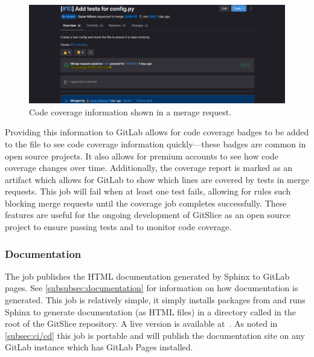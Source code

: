 \documentclass[11pt]{article}
\begin{document}
    \begin{figure}[h]
        \centering
        \includegraphics[width=\textwidth]{code_coverage_gitlab}
        \vspace{-0.5cm}
        \caption[skip=0pt]{Code coverage information shown in a merage request.}
        \label{fig:code_coverage_gitlab}
    \end{figure}

    Providing this information to GitLab allows for code coverage badges to be added to the  file to see code coverage information quickly---these badges are common in open source projects.
    It also allows for premium accounts to see how code coverage changes over time.
    Additionally, the coverage report is marked as an artifact which allows for GitLab to show which lines are covered by tests in merge requests.
    This job will fail when at least one test fails, allowing for rules such blocking merge requests until the coverage job completes successfully.
    These features are useful for the ongoing development of GitSlice as an open source project to ensure passing tests and to monitor code coverage.

    \subsubsection{Documentation}

    The  job publishes the HTML documentation generated by Sphinx to GitLab pages.
    See \autoref{subsubsec:documentation} for information on how documentation is generated.
    This job is relatively simple, it simply installs packages from  and runs Sphinx to generate documentation (as HTML files) in a directory called  in the root of the GitSlice repository.
    A live version is available at~\cite{docs_site}.
    As noted in \autoref{subsec:ci/cd} this job is portable and will publish the documentation site on any GitLab instance which has GitLab Pages installed.
\end{document}
